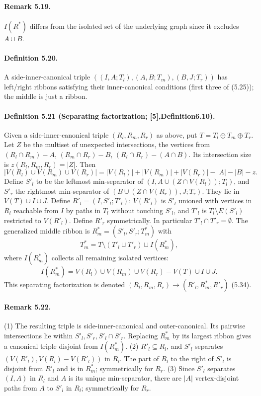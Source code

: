 \documentclass[10pt,a4paper]{article}
\begin{document}
\paragraph{Remark 5.19.} $I(R^*)$ differs from the isolated set of the underlying graph since it excludes $A\cup B$.
\paragraph{Definition 5.20.} A side-inner-canonical triple $((I,A;T_l),(A,B;T_m),(B,J;T_r))$ has left/right ribbons satisfying their inner-canonical conditions (first three of (5.25)); the middle is just a ribbon.
\paragraph{Definition 5.21 (Separating factorization; [5],Definition6.10).} Given a side-inner-canonical triple $(R_l,R_m,R_r)$ as above, put $T=T_l\oplus T_m\oplus T_r$. Let $Z$ be the multiset of unexpected intersections, the vertices from $(R_l\cap R_m)-A$, $(R_m\cap R_r)-B$, $(R_l\cap R_r)-(A\cap B)$. Its intersection size is $z(R_l,R_m,R_r)=|Z|$. Then
\[|V(R_l)\cup V(R_m)\cup V(R_r)|=|V(R_l)|+|V(R_m)|+|V(R_r)|-|A|-|B|-z.\tag{5.32}\]
Define $S'_l$ to be the leftmost min-separator of $(I,A\cup(Z\cap V(R_l));T_l)$, and $S'_r$ the rightmost min-separator of $(B\cup(Z\cap V(R_r)),J;T_r)$. They lie in $V(T)\cup I\cup J$. Define $R'_l=(I,S'_l;T'_l)$: $V(R'_l)$ is $S'_l$ unioned with vertices in $R_l$ reachable from $I$ by paths in $T_l$ without touching $S'_l$, and $T'_l$ is $T_l\setminus E(S'_l)$ restricted to $V(R'_l)$. Define $R'_r$ symmetrically. In particular $T'_l\cap T'_r=\emptyset$. The generalized middle ribbon is $R^*_m=(S'_l,S'_r;T^*_m)$ with
\[T^*_m=T\setminus(T'_l\sqcup T'_r)\sqcup I(R^*_m),\]
where $I(R^*_m)$ collects all remaining isolated vertices:
\[I(R^*_m)=V(R_l)\cup V(R_m)\cup V(R_r)-V(T)\cup I\cup J.\tag{5.33}\]
This separating factorization is denoted $(R_l,R_m,R_r)\to(R'_l,R^*_m,R'_r)$ (5.34).
\paragraph{Remark 5.22.} (1) The resulting triple is side-inner-canonical and outer-canonical. Its pairwise intersections lie within $S'_l,S'_r,S'_l\cap S'_r$. Replacing $R^*_m$ by its largest ribbon gives a canonical triple disjoint from $I(R^*_m)$. (2) $R'_l\subseteq R_l$, and $S'_l$ separates $(V(R'_l),V(R_l)-V(R'_l))$ in $R_l$. The part of $R_l$ to the right of $S'_l$ is disjoint from $R'_l$ and is in $R^*_m$; symmetrically for $R_r$. (3) Since $S'_l$ separates $(I,A)$ in $R_l$ and $A$ is its unique min-separator, there are $|A|$ vertex-disjoint paths from $A$ to $S'_l$ in $R_l$; symmetrically for $R_r$.
\end{document}
